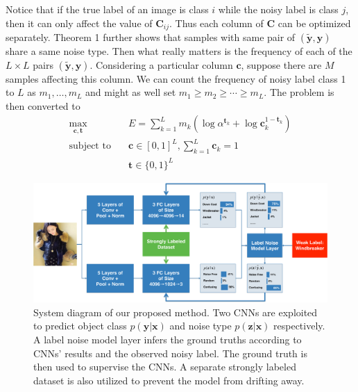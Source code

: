 \documentclass[10pt,twocolumn,letterpaper]{article}
\def\vec{\mathbf}
\def\mat{\mathbf}
\begin{document}
Notice that if the true label of an image is class $i$ while the noisy label is class $j$, then it can only affect the value of $\mat{C}_{ij}$. Thus each column of $\mat{C}$ can be optimized separately. Theorem 1 further shows that samples with same pair of $(\tilde{\vec{y}},\vec{y})$ share a same noise type. Then what really matters is the frequency of each of the $L\times L$ pairs $(\tilde{\vec{y}},\vec{y})$. Considering a particular column $\vec{c}$, suppose there are $M$ samples affecting this column. We can count the frequency of noisy label class 1 to $L$ as $m_1,\dots,m_L$ and might as well set $m_1\geq m_2\geq \cdots \geq m_L$. The problem is then converted to
\begin{equation}
\begin{aligned}
\max_{\vec{c},\vec{t}} \quad & E=\sum_{k=1}^{L} m_k \left(\log \alpha^{\vec{t}_k} + \log \mat{c}_k^{1-\vec{t}_k}\right)\\
\text{subject to} \quad & \vec{c} \in [0,1]^L, \sum_{k=1}^{L} \vec{c}_k = 1 \\
                    & \vec{t} \in \{0,1\}^{L}
\end{aligned}
\end{equation}


\begin{figure}
\begin{center}
\includegraphics[width=0.9\linewidth]{figure/diagram.pdf}
\end{center}
\caption{System diagram of our proposed method. Two CNNs are exploited to predict object class $p(\vec{y}|\vec{x})$ and noise type $p(\vec{z}|\vec{x})$ respectively. A label noise model layer infers the ground truths according to CNNs' results and the observed noisy label. The ground truth is then used to supervise the CNNs. A separate strongly labeled dataset is also utilized to prevent the model from drifting away.}
\label{fig:framework}
\end{figure}
\end{document}
